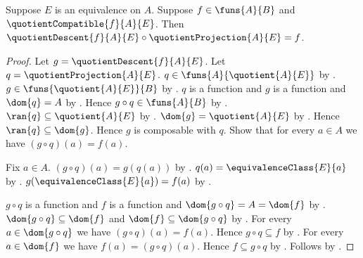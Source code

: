 \begin{theorem}\label{quotient_descent_factorization}
    Suppose $E$ is an equivalence on $A$.
    Suppose $f\in\funs{A}{B}$ and $\quotientCompatible{f}{A}{E}$.
    Then
        $\quotientDescent{f}{A}{E}\circ\quotientProjection{A}{E}=f$.
\end{theorem}
\begin{proof}
    Let $g=\quotientDescent{f}{A}{E}$.
    Let $q=\quotientProjection{A}{E}$.
    $q\in\funs{A}{\quotient{A}{E}}$ by
        .
    $g\in\funs{\quotient{A}{E}}{B}$ by
        .
    $q$ is a function and $g$ is a function and $\dom{q}=A$ by
        .
    Hence $g\circ q\in\funs{A}{B}$ by .
    $\ran{q}\subseteq\quotient{A}{E}$ by .
    $\dom{g}=\quotient{A}{E}$ by .
    Hence $\ran{q}\subseteq\dom{g}$.
    Hence $g$ is composable with $q$.
    Show that for every $a\in A$ we have $(g\circ q)(a)=f(a)$.
    \begin{subproof}
        Fix $a\in A$.
        $(g\circ q)(a)=g(q(a))$ by .
        $q(a)=\equivalenceClass{E}{a}$ by
            .
        $g(\equivalenceClass{E}{a})=f(a)$ by
            .
    \end{subproof}
    $g\circ q$ is a function and $f$ is a function and
        $\dom{g\circ q}=A=\dom{f}$ by
        .
    $\dom{g\circ q}\subseteq\dom{f}$ and
        $\dom{f}\subseteq\dom{g\circ q}$ by
        .
    For every $a\in\dom{g\circ q}$ we have
        $(g\circ q)(a)=f(a)$.
    Hence $g\circ q\subseteq f$ by .
    For every $a\in\dom{f}$ we have
        $f(a)=(g\circ q)(a)$.
    Hence $f\subseteq g\circ q$ by .
    Follows by .
\end{proof}

